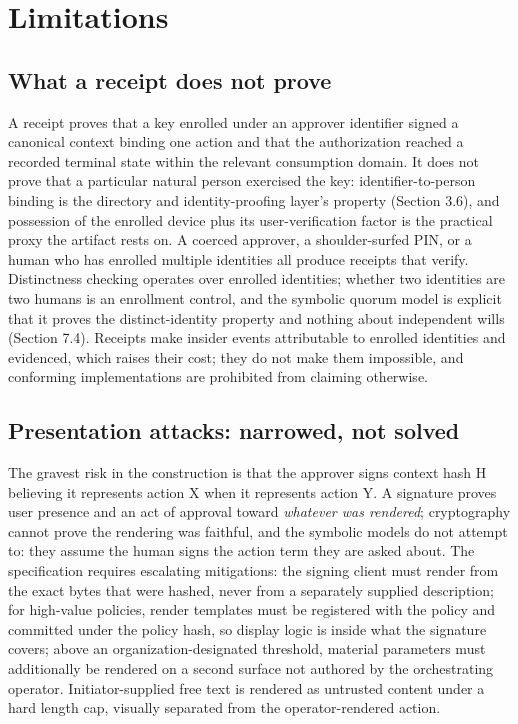 \documentclass[11pt]{article}
\begin{document}
\section{Limitations}

\subsection{What a receipt does not prove}

A receipt proves that a key enrolled under an approver identifier signed a
canonical context binding one action and that the authorization reached a recorded
terminal state within the relevant consumption domain. It does not prove that a
particular natural person exercised the key: identifier-to-person binding is the
directory and identity-proofing layer's property (Section 3.6), and possession of
the enrolled device plus its user-verification factor is the practical proxy the
artifact rests on. A coerced approver, a shoulder-surfed PIN, or a human who has
enrolled multiple identities all produce receipts that verify. Distinctness
checking operates over enrolled identities; whether two identities are two humans
is an enrollment control, and the symbolic quorum model is explicit that it proves
the distinct-identity property and nothing about independent wills (Section 7.4).
Receipts make insider events attributable to enrolled identities and evidenced,
which raises their cost; they do not make them impossible, and conforming
implementations are prohibited from claiming otherwise.

\subsection{Presentation attacks: narrowed, not solved}

The gravest risk in the construction is that the approver signs context hash H
believing it represents action X when it represents action Y. A signature proves
user presence and an act of approval toward \emph{whatever was rendered};
cryptography cannot prove the rendering was faithful, and the symbolic models do not
attempt to: they assume the human signs the action term they are asked about. The
specification requires escalating mitigations: the signing client must render from
the exact bytes that were hashed, never from a separately supplied description; for
high-value policies, render templates must be registered with the policy and
committed under the policy hash, so display logic is inside what the signature
covers; above an organization-designated threshold, material parameters must
additionally be rendered on a second surface not authored by the orchestrating
operator. Initiator-supplied free text is rendered as untrusted content under a hard
length cap, visually separated from the operator-rendered action.
\end{document}
